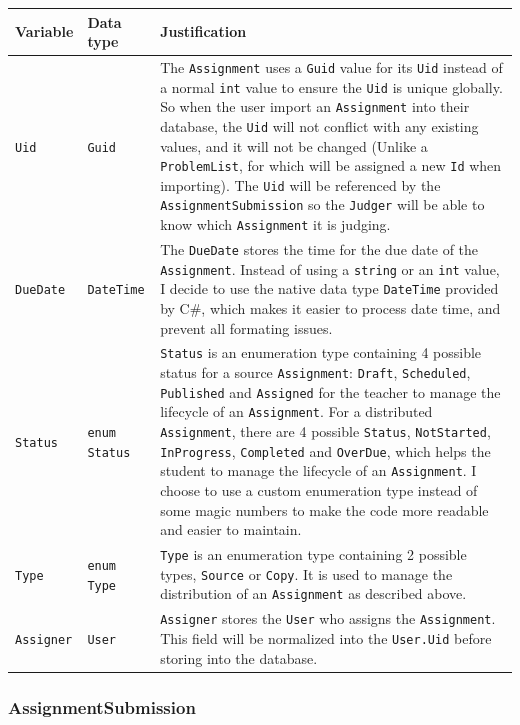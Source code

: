 \documentclass[a4paper]{report}
\begin{document}
\begin{tabulary}{\textwidth}{|l|l|L|}
    \hline
    Variable & Data type & Justification \\
    \hline
    \verb|Uid| & \verb|Guid| & The \verb|Assignment| uses a \verb|Guid| value for its \verb|Uid| instead of a normal \verb|int| value to ensure the \verb|Uid| is unique globally. So when the user import an \verb|Assignment| into their database, the \verb|Uid| will not conflict with any existing values, and it will not be changed (Unlike a \verb|ProblemList|, for which will be assigned a new \verb|Id| when importing). The \verb|Uid| will be referenced by the \verb|AssignmentSubmission| so the \verb|Judger| will be able to know which \verb|Assignment| it is judging. \\
    \hline
    \verb|DueDate| & \verb|DateTime| & The \verb|DueDate| stores the time for the due date of the \verb|Assignment|. Instead of using a \verb|string| or an \verb|int| value, I decide to use the native data type \verb|DateTime| provided by C\#, which makes it easier to process date time, and prevent all formating issues. \\
    \hline
    \verb|Status| & \verb|enum Status| & \verb|Status| is an enumeration type containing 4 possible status for a source \verb|Assignment|: \verb|Draft|, \verb|Scheduled|, \verb|Published| and \verb|Assigned| for the teacher to manage the lifecycle of an \verb|Assignment|. For a distributed \verb|Assignment|, there are 4 possible \verb|Status|, \verb|NotStarted|, \verb|InProgress|, \verb|Completed| and \verb|OverDue|, which helps the student to manage the lifecycle of an \verb|Assignment|. I choose to use a custom enumeration type instead of some magic numbers to make the code more readable and easier to maintain.\\
    \hline
    \verb|Type| & \verb|enum Type| & \verb|Type| is an enumeration type containing 2 possible types, \verb|Source| or \verb|Copy|. It is used to manage the distribution of an \verb|Assignment| as described above. \\
    \hline
    \verb|Assigner| & \verb|User| & \verb|Assigner| stores the \verb|User| who assigns the \verb|Assignment|. This field will be normalized into the \verb|User.Uid| before storing into the database. \\
    \hline
\end{tabulary}

\subsubsection{AssignmentSubmission}
\end{document}
